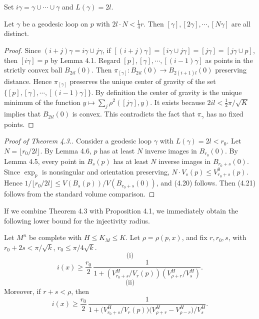 Set $i\gamma=\gamma\cup \cdots \cup \gamma$ and $L(\gamma)=2l$.

\begin{lemma}
\label{lem:iterated-geodesic-loops}
Let $\gamma$ be a geodesic loop on $p$ with $2l \cdot N < \frac14 r$. Then
$[\gamma], [2\gamma], \cdots, [N\gamma]$ are all distinct.
\end{lemma}

\begin{proof}
Since $(i+j)\gamma=i\gamma \cup j\gamma$, if
$[(i+j)\gamma]=[i\gamma \cup j\gamma]=[j\gamma]=[j\gamma \cup p]$, then
$[i\gamma]=p$ by Lemma 4.1. Regard $[p],[\gamma],\cdots,[(i-1)\gamma]$ as points
in the strictly convex ball $B_{2il}(0)$. Then $\pi_{[\gamma]}: B_{2il}(0) \to
B_{2(i+1)l}(0)$ preserving distance. Hence $\pi_{[\gamma]}$ preserves the unique
center of gravity of the set $\{[p],[\gamma],\cdots,[(i-1)\gamma]\}$. By
definition the center of gravity is the unique minimum of the function
$y \mapsto \sum_j \rho^2([j\gamma],y)$. It exists because $2il < \frac12
\pi/\sqrt{K}$ implies that $B_{2il}(0)$ is convex. This contradicts the fact that
$\pi_\gamma$ has no fixed points.
\end{proof}

\begin{proof}[Proof of Theorem 4.3.]
Consider a geodesic loop $\gamma$ with
$L(\gamma)=2l<r_0$. Let $N=\lfloor r_0/2l \rfloor$. By Lemma 4.6, $p$ has at
least $N$ inverse images in $B_{r_0}(0)$. By Lemma 4.5, every point in
$B_s(p)$ has at least $N$ inverse images in $B_{r_0+s}(0)$. Since $\exp_p$ is
nonsingular and orientation preserving, $N \cdot V_s(p) \le V^0_{r_0+s}(p)$.
Hence $1/\lfloor r_0/2l \rfloor \le V(B_s(p))/V(B_{r_0+s}(0))$, and (4.20)
follows. Then (4.21) follows from the standard volume comparison.
\end{proof}

If we combine Theorem 4.3 with Proposition 4.1, we immediately obtain the
following lower bound for the injectivity radius.

\begin{theorem}
\label{thm:injectivity-radius-relative-volume}
Let $M^n$ be complete with $H \le K_M \le K$.
Let $\rho=\rho(p,x)$, and fix $r, r_0, s$, with $r_0 + 2s < \pi/\sqrt{k}$,
$r_0 \le \pi/4\sqrt{k}$.
\[
\text{(i)}
\]
\begin{equation}
\tag{4.23}
i(x) \ge \frac{r_0}{2}\,\frac{1}{1+\left(V^H_{r_0+s}/V_r(p)\right)\left(V^H_{\rho+r}/V^H_s\right)}.
\end{equation}
\[
\text{(ii)}
\]
Moreover, if $r+s<\rho$, then
\begin{equation}
\tag{4.24}
i(x)\ge \frac{r_0}{2}\,\frac{1}{1+\bigl(V^{H}_{r_0+s}/V_r(p)\bigr)\bigl(V^{H}_{\rho+r}-V^{H}_{\rho-r}\bigr)/V^{H}_s}.
\end{equation}
\end{theorem}

